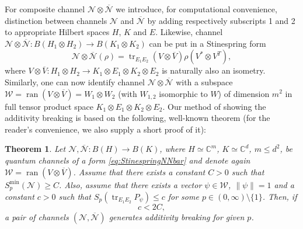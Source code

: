 \documentclass[reqno]{amsart}
\theoremstyle{plain}
\newtheorem{theorem}{Theorem}
\theoremstyle{note}
\newcommand{\complexes}{\mathbb{C}}
\newcommand{\ran}[1]{\operatorname{ran}{#1}}
\newcommand{\ptr}[2]{\operatorname{tr}_{#1}{#2}}
\newcommand{\proj}[1]{P_{#1}}
\begin{document}
For composite channel $\mathcal{N}\otimes\overline{\mathcal{N}}$ we introduce, for computational convenience, distinction between channels $\mathcal{N}$ and $\overline{\mathcal{N}}$ by adding respectively subscripts 1 and 2 to appropriate Hilbert spaces $H$, $K$ and $E$. Likewise, channel $\mathcal{N}\otimes\overline{\mathcal{N}} : B(H_1\otimes H_2) \to B(K_1 \otimes K_2)$ can be put in a Stinespring form
 \begin{equation}
     \mathcal{N}\otimes\overline{\mathcal{N}}(\rho) = \ptr{E_1 E_2}{(V\otimes \overline{V})\rho (V^* \otimes V^T)},
 \end{equation}
 where $V\otimes \overline{V} : H_1\otimes H_2 \to K_1 \otimes E_1 \otimes K_2 \otimes E_2$ is naturally also an isometry. Similarly, one can now identify channel $\mathcal{N}\otimes\overline{\mathcal{N}}$ with a subspace $\mathcal{W} = \ran{(V\otimes \overline{V})} = W_1\otimes W_2$ (with $W_{1,2}$ isomorphic to $W$) of dimension $m^2$ in full tensor product space $K_1 \otimes E_1 \otimes K_2 \otimes E_2$. Our method of showing the additivity breaking is based on the following, well-known theorem (for the reader's convenience, we also supply a short proof of it):
 
 \begin{theorem}\label{thm:TheTheorem}
 Let $\mathcal{N}, \overline{\mathcal{N}} : B(H) \to B(K)$, where $H\simeq\complexes^m$, $K\simeq\complexes^d$, $m\leqslant d^2$, be quantum channels of a form \eqref{eq:StinespringNNbar} and denote again $\mathcal{W} = \ran{ (V\otimes\overline{V})}$. Assume that there exists a constant $C > 0$ such that $S_{p}^{\mathrm{min}}(\mathcal{N}) \geqslant C$. Also, assume that there exists a vector $\psi \in \mathcal{W}$, $\| \psi \| = 1$ and a constant $c>0$ such that $S_{p}(\ptr{E_1 E_2}{\proj{\psi}}) \leqslant c$ for some $p \in (0,\infty ) \setminus \{1\}$. Then, if
 \begin{equation}
     c<2C,
 \end{equation}
 a pair of channels $(\mathcal{N},\overline{\mathcal{N}})$ generates additivity breaking for given $p$.
 \end{theorem}
 
\end{document}
